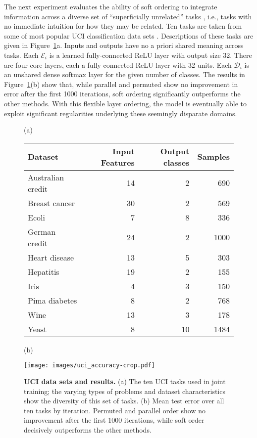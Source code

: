 \documentclass{article}
\theoremstyle{definition}
\theoremstyle{remark}
\begin{document}
The next experiment evaluates the ability of soft ordering to integrate information across a diverse set of ``superficially unrelated'' tasks \citep{Mahmud:2008}, i.e., tasks with no immediate intuition for how they may be related.
Ten tasks are taken from some of most popular UCI classification data sets \citep{Lichman:2013}. 
Descriptions of these tasks are given in Figure~\ref{fig:uci_results}a.
Inputs and outputs have no a priori shared meaning across tasks.
Each $\mathcal{E}_i$ is a learned fully-connected ReLU layer with output size 32.
There are four core layers, each a fully-connected ReLU layer with 32 units.
Each $\mathcal{D}_i$ is an unshared dense softmax layer for the given number of classes.
The results in Figure~\ref{fig:uci_results}(b)
show that, while parallel and permuted show no improvement in error after the first 1000 iterations, soft ordering significantly outperforms the other methods.
With this flexible layer ordering, the model is eventually able to exploit significant regularities underlying these seemingly disparate domains.
\begin{figure}
\footnotesize
(a)
\begin{minipage}{.48\textwidth}
\vspace{0pt}
\centering
\scriptsize
\begin{flushleft}
\begin{tabular}{lrrr}
    \toprule
    Dataset & Input Features & Output classes & Samples \\
    \midrule
    Australian credit & 14 & 2 & 690 \\
    Breast cancer & 30 & 2& 569 \\
    Ecoli & 7 & 8 & 336 \\
    German credit & 24 & 2 & 1000 \\
    Heart disease & 13 & 5 & 303 \\
    Hepatitis & 19 & 2 & 155 \\
    Iris & 4 & 3 & 150 \\
    Pima diabetes & 8 & 2 & 768 \\
    Wine & 13 & 3 & 178 \\
    Yeast & 8 & 10 & 1484 \\
    \bottomrule
\end{tabular}
\end{flushleft}
\end{minipage}
\hspace{7pt} \small(b) \hspace{1pt}
\begin{minipage}{.4\textwidth}
\vspace{0pt}
\texttt{[image: images/uci\_accuracy-crop.pdf]}
\end{minipage}%
\caption{\textbf{UCI data sets and results.} (a) The ten UCI tasks used in joint training; the varying types of problems and dataset characteristics show the diversity of this set of tasks. (b) Mean test error over all ten tasks by iteration. Permuted and parallel order show no improvement after the first 1000 iterations, while soft order decisively outperforms the other methods.}
\label{fig:uci_results}
\end{figure}
\end{document}

